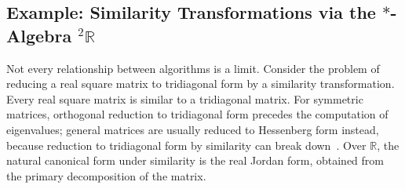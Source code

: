 \documentclass[12pt, a4paper]{report}
\theoremstyle{plain}
\theoremstyle{definition}
\theoremstyle{remark}
\theoremstyle{plain}
\newcommand{\RR}{\mathbb{R}}
\newcommand{\twoR}{{}^{2}\mathbb{R}}
\begin{document}
\subsection{Example: Similarity Transformations via the \texorpdfstring{$*$}{*}-Algebra \texorpdfstring{$\twoR$}{2R}}
\label{subsec:2R}
Not every relationship between algorithms is a limit. Consider the problem of reducing a real square matrix to tridiagonal form by a similarity transformation. Every real square matrix is similar to a tridiagonal matrix. For symmetric matrices, orthogonal reduction to tridiagonal form precedes the computation of eigenvalues; general matrices are usually reduced to Hessenberg form instead, because reduction to tridiagonal form by similarity can break down~\cite{GolubVanLoan2013}. Over $\RR$, the natural canonical form under similarity is the real Jordan form, obtained from the primary decomposition of the matrix.
\end{document}
